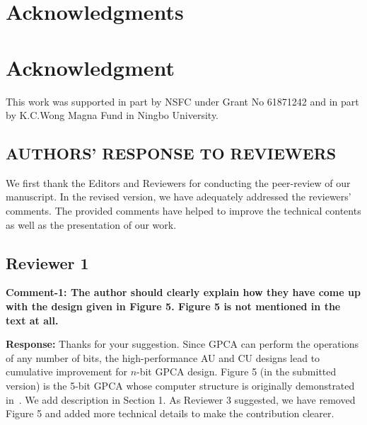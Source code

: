 \documentclass[9pt,journal,compsoc]{IEEEtran}
\begin{document}
\vspace{-2ex}
\ifCLASSOPTIONcompsoc
  \section*{Acknowledgments}
\else
  \section*{Acknowledgment}
\fi
This work was supported in part by NSFC under Grant No 61871242 and in part by K.C.Wong Magna Fund in Ningbo University.
\vspace{-2ex}
\ifCLASSOPTIONcaptionsoff
  \newpage
\fi
\tiny



\begin{appendices} 
	\setlength{\parindent}{0pt}
	\setlength{\parskip}{2em}
\section{AUTHORS’ RESPONSE TO REVIEWERS} 
\normalsize
We first thank the Editors and Reviewers for conducting the peer-review of our manuscript. In the revised version, we have adequately addressed the reviewers’ comments.
The provided comments have helped to improve the technical contents as well as the presentation of our work. 


\subsection{Reviewer 1}
{\bfseries Comment-1: The author should clearly explain how they have come up with the design given in Figure 5. Figure 5 is not mentioned in the text at all.}

{\bfseries Response:} Thanks for your suggestion. Since GPCA can perform the operations of any number of bits, the high-performance AU and CU designs lead to cumulative improvement for $n$-bit GPCA design. 
Figure 5 (in the submitted version) is the 5-bit GPCA whose computer structure is originally demonstrated in~\cite{4}. 
We add description in Section 1.
As Reviewer 3 suggested, we have removed Figure 5 and added more technical details to make the contribution clearer.




\end{appendices}
\end{document}
